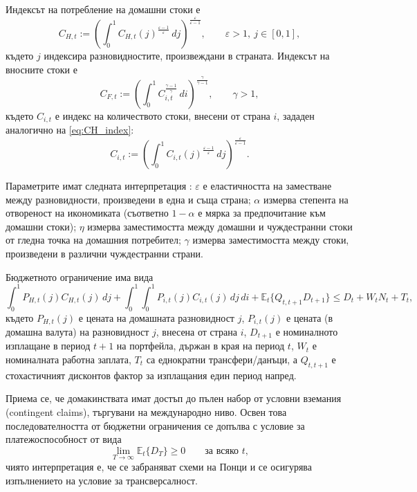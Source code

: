 Индексът на потребление на домашни стоки е
\begin{equation}
C_{H,t} := \left( \int_0^1 C_{H,t}(j)^{\frac{\varepsilon-1}{\varepsilon}}\, dj \right)^{\frac{\varepsilon}{\varepsilon-1}},
\qquad \varepsilon > 1,\ j \in [0,1],
\label{eq:CH_index}
\end{equation}
където $j$ индексира разновидностите, произвеждани в страната. Индексът на вносните стоки е
\begin{equation}
C_{F,t} := \left( \int_0^1 C_{i,t}^{\frac{\gamma-1}{\gamma}}\, di \right)^{\frac{\gamma}{\gamma-1}},
\qquad \gamma > 1,
\label{eq:CF_index}
\end{equation}
където $C_{i,t}$ е индекс на количеството стоки, внесени от страна $i$, зададен аналогично на \eqref{eq:CH_index}:
\begin{equation}
C_{i,t} := \left( \int_0^1 C_{i,t}(j)^{\frac{\varepsilon-1}{\varepsilon}}\, dj \right)^{\frac{\varepsilon}{\varepsilon-1}}.
\label{eq:Ci_index}
\end{equation}

Параметрите имат следната интерпретация \parencite[с.~152]{Gali2008}:
$\varepsilon$ е еластичността на заместване между разновидности, произведени в една и съща страна;
$\alpha$ измерва степента на отвореност на икономиката (съответно $1-\alpha$ е мярка за предпочитание към домашни стоки);
$\eta$ измерва заместимостта между домашни и чуждестранни стоки от гледна точка на домашния потребител;
$\gamma$ измерва заместимостта между стоки, произведени в различни чуждестранни страни.

Бюджетното ограничение има вида
\begin{equation}
\int_0^1 P_{H,t}(j) C_{H,t}(j)\, dj
+ \int_0^1 \!\! \int_0^1 P_{i,t}(j) C_{i,t}(j)\, dj\, di
+ \mathbb{E}_t\{ Q_{t,t+1} D_{t+1} \}
\le D_t + W_t N_t + T_t,
\label{eq:budget_full}
\end{equation}
където $P_{H,t}(j)$ е цената на домашната разновидност $j$, $P_{i,t}(j)$ е цената (в домашна валута) на разновидност $j$, внесена от страна $i$, $D_{t+1}$ е номиналното изплащане в период $t+1$ на портфейла, държан в края на период $t$, $W_t$ е номиналната работна заплата, $T_t$ са еднократни трансфери/данъци, а $Q_{t,t+1}$ е стохастичният дисконтов фактор за изплащания един период напред.

Приема се, че домакинствата имат достъп до пълен набор от условни вземания (contingent claims), търгувани на международно ниво. Освен това последователността от бюджетни ограничения се допълва с условие за платежоспособност от вида
\begin{equation}
\lim_{T \to \infty} \mathbb{E}_t\{ D_T \} \ge 0
\qquad \text{за всяко } t,
\label{eq:solvency}
\end{equation}
чиято интерпретация е, че се забраняват схеми на Понци и се осигурява изпълнението на условие за трансверсалност.

